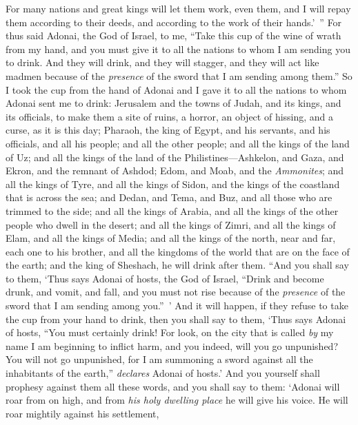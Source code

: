 \begin{biblechapter}
\verse For many nations and great kings will let them work, even them, and I will repay them according to their deeds, and according to the work of their hands.’ ”
\verse For thus said Adonai, the God of Israel, to me, “Take this cup of the wine of wrath from my hand, and you must give it to all the nations to whom I am sending you to drink.
\verse And they will drink, and they will stagger, and they will act like madmen because of the \textit{presence} of the sword that I am sending among them.”
\verse So I took the cup from the hand of Adonai and I gave it to all the nations to whom Adonai sent me to drink:
\verse Jerusalem and the towns of Judah, and its kings, and its officials, to make them a site of ruins, a horror, an object of hissing, and a curse, as it is this day;
\verse Pharaoh, the king of Egypt, and his servants, and his officials, and all his people;
\verse and all the other people; and all the kings of the land of Uz; and all the kings of the land of the Philistines—Ashkelon, and Gaza, and Ekron, and the remnant of Ashdod;
\verse Edom, and Moab, and the \textit{Ammonites};
\verse and all the kings of Tyre, and all the kings of Sidon, and the kings of the coastland that is across the sea;
\verse and Dedan, and Tema, and Buz, and all those who are trimmed to the side;
\verse and all the kings of Arabia, and all the kings of the other people who dwell in the desert;
\verse and all the kings of Zimri, and all the kings of Elam, and all the kings of Media;
\verse and all the kings of the north, near and far, each one to his brother, and all the kingdoms of the world that are on the face of the earth; and the king of Sheshach, he will drink after them.
\verse “And you shall say to them, ‘Thus says Adonai of hosts, the God of Israel, “Drink and become drunk, and vomit, and fall, and you must not rise because of the \textit{presence} of the sword that I am sending among you.” ’
\verse And it will happen, if they refuse to take the cup from your hand to drink, then you shall say to them, ‘Thus says Adonai of hosts, “You must certainly drink!
\verse For look, on the city that is called \textit{by} my name I am beginning to inflict harm, and you indeed, will you go unpunished? You will not go unpunished, for I am summoning a sword against all the inhabitants of the earth,” \textit{declares} Adonai of hosts.’
\verse And you yourself shall prophesy against them all these words, and you shall say to them:
\verse ‘Adonai will roar from on high, 
and from \textit{his holy dwelling place} he will give his voice. 
He will roar mightily against his settlement, 

\end{biblechapter}
